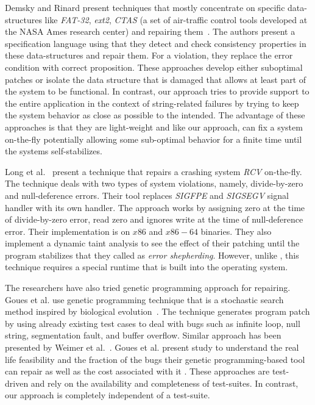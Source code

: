  Demsky and Rinard present techniques that
mostly concentrate on specific data-structures like \emph{FAT-32}, \emph{ext2},
\emph{CTAS} (a set of air-traffic control tools developed at the NASA Ames
research center) and repairing them~\cite{Demsky03automaticdata,
conf/issre/DemskyR03,conf/oopsla/DemskyR03, conf/issta/DemskyEGMPR06}. The
authors present a specification language using that they detect and check
consistency properties in these data-structures and repair them. For a
violation, they replace the error condition with correct proposition. These
approaches develop either suboptimal patches or isolate the data structure that
is damaged that allows at least part of the system to be functional. In
contrast, our approach tries to provide support to the entire application in the
context of string-related failures by trying to keep the system behavior as
close as possible to the intended. The advantage of these approaches is that
they are light-weight and like our approach, can fix a system on-the-fly
potentially allowing some sub-optimal behavior for a finite time until the
systems self-stabilizes.

Long et al.~\cite{conf/pldi/LongSR14} present a technique that repairs a
crashing system \emph{RCV} on-the-fly. The technique deals with two types of
system violations, namely, divide-by-zero and null-deference errors. Their tool
replaces \emph{SIGFPE} and \emph{SIGSEGV} signal handler with its own handler.
The approach works by assigning zero at the time of divide-by-zero error, read
zero and ignores write at the time of null-deference error. Their implementation
is on $x86$ and $x86-64$ binaries. They also implement a dynamic taint analysis
to see the effect of their patching until the program stabilizes that they
called as \emph{error shepherding}. However, unlike \tool, this technique
requires a special runtime that is built into the operating system.

 The researchers have also tried genetic
programming approach for repairing. Goues et al. use genetic programming
technique that is a stochastic search method inspired by biological
evolution~\cite{GouesNFW12}. The technique generates program patch by using
already existing test cases to deal with bugs such as infinite loop, null
string, segmentation fault, and buffer overflow. Similar approach has been
presented by Weimer et al.~\cite{WeimerFGN10}. Goues et al. present study to
understand the real life feasibility and the fraction of the bugs their genetic
programming-based tool can repair as well as the cost associated with it
\cite{GouesDFW12}. These approaches are test-driven and rely on the availability
and completeness of test-suites. In contrast, our approach is completely
independent of a test-suite.

